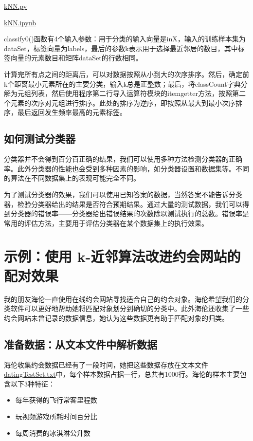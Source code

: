 \begin{tcolorbox}[title=代码清单]
    \href{https://github.com/JPL-JUNO/Machine-Learning-in-Action/blob/main/Codes/kNN.py}{kNN.py}

    \href{https://github.com/JPL-JUNO/Machine-Learning-in-Action/blob/main/Codes/kNN.ipynb}{kNN.ipynb}
\end{tcolorbox}

classify0()函数有4个输入参数：用于分类的输入向量是inX，输入的训练样本集为dataSet，标签向量为labels，最后的参数k表示用于选择最近邻居的数目，其中标签向量的元素数目和矩阵dataSet的行数相同。

计算完所有点之间的距离后，可以对数据按照从小到大的次序排序。然后，确定前k个距离最小元素所在的主要分类，输入k总是正整数；最后，将classCount字典分解为元组列表，然后使用程序第二行导入运算符模块的itemgetter方法，按照第二个元素的次序对元组进行排序。此处的排序为逆序，即按照从最大到最小次序排序，最后返回发生频率最高的元素标签。
\subsection{如何测试分类器}

分类器并不会得到百分百正确的结果，我们可以使用多种方法检测分类器的正确率。此外分类器的性能也会受到多种因素的影响，如分类器设置和数据集等。不同的算法在不同数据集上的表现可能完全不同。

为了测试分类器的效果，我们可以使用已知答案的数据，当然答案不能告诉分类器，检验分类器给出的结果是否符合预期结果。通过大量的测试数据，我们可以得到分类器的错误率——分类器给出错误结果的次数除以测试执行的总数。错误率是常用的评估方法，主要用于评估分类器在某个数据集上的执行效果。


\section{示例：使用 k-近邻算法改进约会网站的配对效果}
我的朋友海伦一直使用在线约会网站寻找适合自己的约会对象。海伦希望我们的分类软件可以更好地帮助她将匹配对象划分到确切的分类中。此外海伦还收集了一些约会网站未曾记录的数据信息，她认为这些数据更有助于匹配对象的归类。
\subsection{准备数据：从文本文件中解析数据}
海伦收集约会数据已经有了一段时间，她把这些数据存放在文本文件\href{}{datingTestSet.txt}中，每个样本数据占据一行，总共有1000行。海伦的样本主要包含以下3种特征：
\begin{itemize}
    \item 每年获得的飞行常客里程数
    \item 玩视频游戏所耗时间百分比
    \item 每周消费的冰淇淋公升数
\end{itemize}

